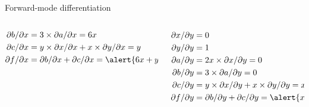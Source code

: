 \documentclass[12pt,aspectratio=169]{beamer}
\begin{document}
\begin{frame}{Forward-mode differentiation}
{\begin{columns}
\begin{column}{0.5\textwidth}
\begin{align*}
                    \partial b / \partial x &= 3 \times \partial a / \partial x = 6 x \\
                    \partial c / \partial x &= y \times \partial x / \partial x + x \times \partial y / \partial x = y \\
                    \partial f / \partial x &= \partial b / \partial x + \partial c / \partial x = \alert{6 x + y}
                \end{align*}
            \end{column}
            \begin{column}{0.5\textwidth}
                \begin{align*}
                    \partial x / \partial y &= 0 \\
                    \partial y / \partial y &= 1 \\
                    \partial a / \partial y &= 2 x \times \partial x / \partial y = 0 \\
                    \partial b / \partial y &= 3 \times \partial a / \partial y = 0 \\
                    \partial c / \partial y &= y \times \partial x / \partial y + x \times \partial y / \partial y = x \\
                    \partial f / \partial y &= \partial b / \partial y + \partial c / \partial y = \alert{x}
                \end{align*}
            \end{column}
        \end{columns}}
\end{frame}
\end{document}
